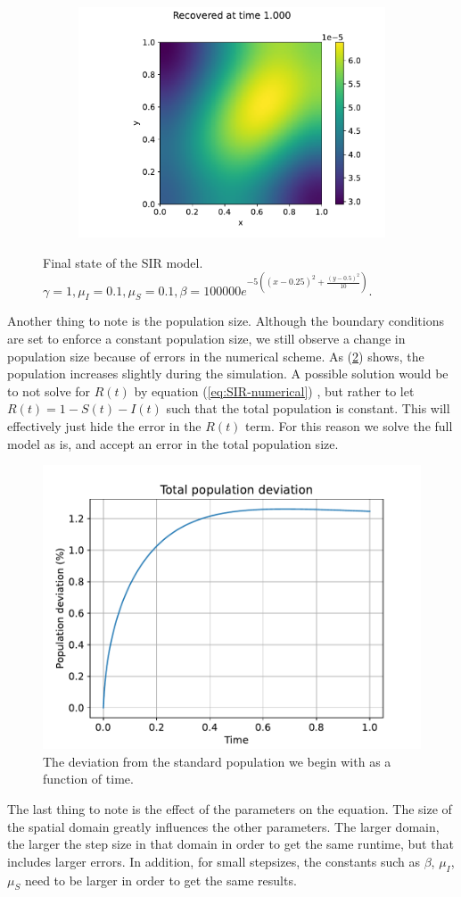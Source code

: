 \begin{figure}
\begin{subfigure}[b]{0.49\linewidth}
        \includegraphics[width=\textwidth]{report/Images/plots/plot-i_t=10000-2.pdf}
    \end{subfigure}
    \caption{Final state of the SIR model. $\gamma = 1,\mu_I = 0.1,\mu_S = 0.1, \beta = 100 000 e^{-5((x-0.25)^2 + \frac{(y-0.5)^2}{10})}$.}
    \label{fig:state_10000}
\end{figure}

Another thing to note is the population size. Although the boundary conditions are set to enforce a constant population size, we still observe a change in population size because of errors in the numerical scheme.
As (\ref{fig:non-constant-population-size}) shows, the population increases slightly during the simulation. 
A possible solution would be to not 
solve for $R(t)$ by equation (\ref{eq:SIR-numerical}) , but rather to let $R(t) = 1- S(t)-I(t)$ such that the total population is constant. This will effectively just 
hide the error in the $R(t)$ term. For this reason we solve the full model as is, and accept an error in the total population size.
\begin{figure}[H]
    \centering
    \includegraphics[width=0.5\linewidth]{report/Images/plots/pop_deviation.pdf}
    \caption{The deviation from the standard population we begin with as a function of time.}
    \label{fig:non-constant-population-size}
\end{figure}

The last thing to note is the effect of the parameters on the equation. The size of the spatial domain greatly influences the other 
parameters. The larger domain, the larger the step size in that domain in order to get the same runtime, but that includes larger errors.
In addition, for small stepsizes, the constants such as $\beta$, $\mu_I$, $\mu_S$ need to be larger in order to get the same results.